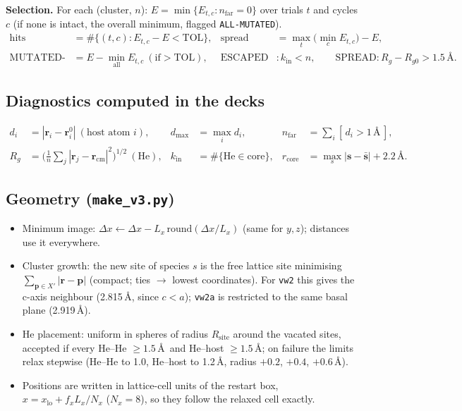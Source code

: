 \documentclass[10pt]{article}
\newcommand{\cmd}[1]{\texttt{\small #1}}
\newcommand{\He}{\mathrm{He}}
\begin{document}
\textbf{Selection.} For each (cluster, $n$): $E = \min\{E_{t,c} : n_\mathrm{far}=0\}$ over trials $t$ and cycles $c$ (if none is intact, the overall minimum, flagged \cmd{ALL-MUTATED}).
\begin{align*}
\text{hits} &= \#\{(t,c): E_{t,c}-E < \text{TOL}\}, &
\text{spread} &= \max_t\big(\min_c E_{t,c}\big) - E, \\
\text{MUTATED-STATE-LOWER-BY} &= E - \min_{\text{all}} E_{t,c}\ (\text{if}>\text{TOL}), &
\text{ESCAPED} &: k_\mathrm{in} < n, \qquad \text{SPREAD}: R_g - R_{g0} > 1.5\,\text{\AA}.
\end{align*}

\subsection{Diagnostics computed in the decks}
\begin{align*}
d_i &= |\mathbf r_i - \mathbf r_i^{0}| \ (\text{host atom } i), &
d_\mathrm{max} &= \max_i d_i, &
n_\mathrm{far} &= \textstyle\sum_i [\,d_i > 1\,\text{\AA}\,], \\
R_g &= \Big(\tfrac1{n}\textstyle\sum_j |\mathbf r_j - \mathbf r_\mathrm{cm}|^2\Big)^{1/2}\ (\text{He}), &
k_\mathrm{in} &= \#\{\He \in \text{core}\}, &
r_\mathrm{core} &= \max_s|\mathbf s - \bar{\mathbf s}| + 2.2\,\text{\AA}.
\end{align*}

\subsection{Geometry (\texttt{make\_v3.py})}\label{sec:geom}
\begin{itemize}
\item Minimum image: $\Delta x \leftarrow \Delta x - L_x\,\mathrm{round}(\Delta x/L_x)$ (same for $y,z$); distances use it everywhere.
\item Cluster growth: the new site of species $s$ is the free lattice site minimising $\sum_{\mathbf p\in X'} |\mathbf r-\mathbf p|$ (compact; ties $\to$ lowest coordinates). For \cmd{vw2} this gives the c-axis neighbour (2.815\,\AA, since $c<a$); \cmd{vw2a} is restricted to the same basal plane (2.919\,\AA).
\item He placement: uniform in spheres of radius $R_\mathrm{site}$ around the vacated sites, accepted if every He--He $\ge1.5$\,\AA\ and He--host $\ge1.5$\,\AA; on failure the limits relax stepwise (He--He to 1.0, He--host to 1.2\,\AA, radius $+0.2$, $+0.4$, $+0.6$\,\AA).
\item Positions are written in lattice-cell units of the restart box, $x = x_\mathrm{lo} + f_x L_x/N_x$ ($N_x=8$), so they follow the relaxed cell exactly.
\end{itemize}
\end{document}
